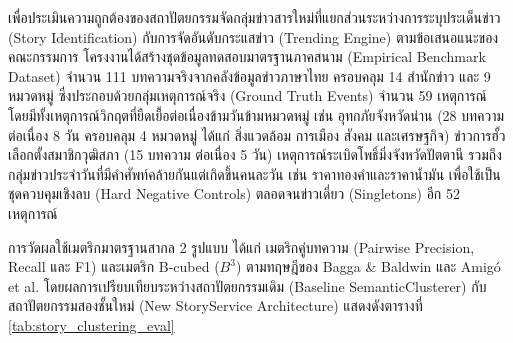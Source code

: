 เพื่อประเมินความถูกต้องของสถาปัตยกรรมจัดกลุ่มข่าวสารใหม่ที่แยกส่วนระหว่างการระบุประเด็นข่าว (Story Identification) กับการจัดอันดับกระแสข่าว (Trending Engine) ตามข้อเสนอแนะของคณะกรรมการ โครงงานได้สร้างชุดข้อมูลทดสอบมาตรฐานภาคสนาม (Empirical Benchmark Dataset) จำนวน 111 บทความจริงจากคลังข้อมูลข่าวภาษาไทย ครอบคลุม 14 สำนักข่าว และ 9 หมวดหมู่ ซึ่งประกอบด้วยกลุ่มเหตุการณ์จริง (Ground Truth Events) จำนวน 59 เหตุการณ์ โดยมีทั้งเหตุการณ์วิกฤตที่ยืดเยื้อต่อเนื่องข้ามวันข้ามหมวดหมู่ เช่น อุทกภัยจังหวัดน่าน (28 บทความ ต่อเนื่อง 8 วัน ครอบคลุม 4 หมวดหมู่ ได้แก่ สิ่งแวดล้อม การเมือง สังคม และเศรษฐกิจ) ข่าวการฮั้วเลือกตั้งสมาชิกวุฒิสภา (15 บทความ ต่อเนื่อง 5 วัน) เหตุการณ์ระเบิดโพธิ์มิ่งจังหวัดปัตตานี รวมถึงกลุ่มข่าวประจำวันที่มีคำศัพท์คล้ายกันแต่เกิดขึ้นคนละวัน เช่น ราคาทองคำและราคาน้ำมัน เพื่อใช้เป็นชุดควบคุมเชิงลบ (Hard Negative Controls) ตลอดจนข่าวเดี่ยว (Singletons) อีก 52 เหตุการณ์

การวัดผลใช้เมตริกมาตรฐานสากล 2 รูปแบบ ได้แก่ เมตริกคู่บทความ (Pairwise Precision, Recall และ F1) และเมตริก B-cubed ($B^3$) ตามทฤษฎีของ Bagga \& Baldwin \cite{bagga1998algorithms} และ Amigó et al. \cite{amigo2009comparison} โดยผลการเปรียบเทียบระหว่างสถาปัตยกรรมเดิม (Baseline SemanticClusterer) กับสถาปัตยกรรมสองชั้นใหม่ (New StoryService Architecture) แสดงดังตารางที่ \ref{tab:story_clustering_eval}

\begin{table}[H]
\centering
\caption{ผลการประเมินเปรียบเทียบประสิทธิภาพการจัดกลุ่มข่าวสารข้ามสำนัก}
\label{tab:story_clustering_eval}
\end{table}

